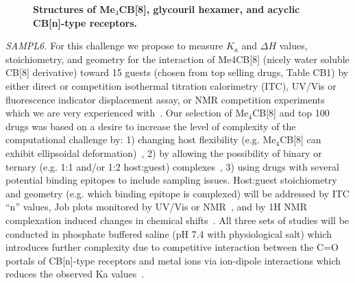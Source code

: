 \documentclass[11pt]{article}
\begin{document}
\begin{figure}[h]
\begin{centering}

\vspace{0.1in}
\caption{\footnotesize {\bf Structures of Me$_4$CB[8], glycouril hexamer, and acyclic CB[n]-type receptors.}
\label{figure:CB}}
\end{centering}
\end{figure}

\emph{SAMPL6.}  
For this challenge we propose to measure $K_a$ and $\Delta H$ values, stoichiometry, and geometry for the interaction of Me4CB[8] (nicely water soluble CB[8] derivative) toward 15 guests (chosen from top selling drugs, Table CB1) by either direct or competition isothermal titration calorimetry (ITC), UV/Vis or fluorescence indicator displacement assay, or NMR competition experiments which we are very experienced with~\cite{cao_attomolar_2014, liu_cucurbituril_2005, ma_acyclic_2010, she_glycoluril-derived_2016}.  
Our selection of Me$_4$CB[8] and top 100 drugs was based on a desire to increase the level of complexity of the computational challenge by: 1) changing host flexibility (e.g. Me$_4$CB[8] can exhibit ellipsoidal deformation)~\cite{vinciguerra_synthesis_2015}, 2) by allowing the possibility of binary or ternary (e.g. 1:1 and/or 1:2 host:guest) complexes~\cite{ko_supramolecular_2007, barrow_cucurbituril-based_2015, urbach_molecular_2011}, 3) using drugs with several potential binding epitopes to include sampling issues.  Host:guest stoichiometry and geometry (e.g. which binding epitope is complexed) will be addressed by ITC ``n'' values, Job plots monitored by UV/Vis or NMR~\cite{connors_binding_1987}, and by 1H NMR complexation induced changes in chemical shifts~\cite{masson_cucurbituril_2012}.  
All three sets of studies will be conducted in phosphate buffered saline (pH 7.4 with physiological salt) which introduces further complexity due to competitive interaction between the C=O portals of CB[n]-type receptors and metal ions via ion-dipole interactions which reduces the observed Ka values~\cite{marquez_mechanism_2004}.
\end{document}
